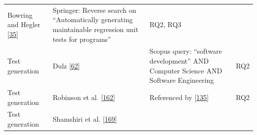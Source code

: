 \documentclass[]{book}
\begin{document}
\begin{longtable}[]{@{}llll@{}}
\begin{minipage}[t]{0.16\columnwidth}
Bowring and Hegler
{[}\protect\hyperlink{ref-bowring2014obsidian}{35}{]}\strut
\end{minipage} & \begin{minipage}[t]{0.50\columnwidth}\raggedright\strut
Springer: Reverse search on ``Automatically generating maintainable
regression unit tests for programs''\strut
\end{minipage} & \begin{minipage}[t]{0.04\columnwidth}\raggedright\strut
RQ2, RQ3\strut
\end{minipage}\tabularnewline
\begin{minipage}[t]{0.18\columnwidth}\raggedright\strut
Test generation\strut
\end{minipage} & \begin{minipage}[t]{0.16\columnwidth}\raggedright\strut
Dulz {[}\protect\hyperlink{ref-dulz2013model}{62}{]}\strut
\end{minipage} & \begin{minipage}[t]{0.50\columnwidth}\raggedright\strut
Scopus query: ``software development'' AND Computer Science AND Software
Engineering\strut
\end{minipage} & \begin{minipage}[t]{0.04\columnwidth}\raggedright\strut
RQ2\strut
\end{minipage}\tabularnewline
\begin{minipage}[t]{0.18\columnwidth}\raggedright\strut
Test generation\strut
\end{minipage} & \begin{minipage}[t]{0.16\columnwidth}\raggedright\strut
Robinson et al. {[}\protect\hyperlink{ref-robinson2011}{162}{]}\strut
\end{minipage} & \begin{minipage}[t]{0.50\columnwidth}\raggedright\strut
Referenced by
{[}\protect\hyperlink{ref-supportingtestsuite}{135}{]}\strut
\end{minipage} & \begin{minipage}[t]{0.04\columnwidth}\raggedright\strut
RQ2\strut
\end{minipage}\tabularnewline
\begin{minipage}[t]{0.18\columnwidth}\raggedright\strut
Test generation\strut
\end{minipage} & \begin{minipage}[t]{0.16\columnwidth}\raggedright\strut
Shamshiri et al.
{[}\protect\hyperlink{ref-shamshiri2018automatically}{169}{]}\strut
\end{minipage} & \begin{minipage}[t]{0.50\columnwidth}\raggedright\strut

\end{minipage}
\end{longtable}
\end{document}
